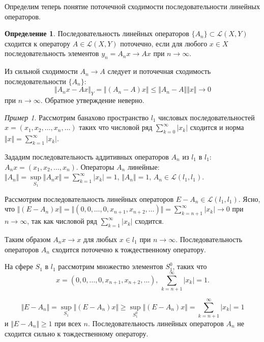 \documentclass[12pt,a4paper,titlepage,oneside]{book}
\theoremstyle{definition}
\newtheorem*{definition}{Определение}
\theoremstyle{plain}
\theoremstyle{break}
\theoremstyle{remark}
\theoremstyle{remark}
\newtheorem*{example}{Пример}
\theoremstyle{remark}
\theoremstyle{remark}
\theoremstyle{plain}
\theoremstyle{plain}
\begin{document}
Определим теперь понятие поточечной сходимости последовательности линейных операторов.

\begin{definition}
Последовательность линейных операторов $\{A_n\} \subset \mathcal{L}(X,Y)$ сходится к оператору $A\in \mathcal{L}(X,Y)$ поточечно, если для любого $x\in X$ последовательность элементов $y_n=A_nx\to Ax$ при $n\to \infty$.
\end{definition}

Из сильной сходимости $A_n\to A$ следует и поточечная сходимость последовательности $\{A_n\}$:
$$\Vert A_nx-Ax\Vert_Y = \Vert(A_n-A)x\Vert\le \Vert A_n-A\Vert \Vert x\Vert\to 0$$ 
при $n\to \infty$.
Обратное утверждение неверно.

\begin{example}
Рассмотрим банахово пространство $l_1$ числовых последовательностей $x=(x_1,x_2,\ldots,x_n,\ldots)$ таких что числовой ряд $\displaystyle\sum_{k=0}^\infty \lvert x_k\rvert $ сходится и норма $\Vert x\Vert=\displaystyle\sum_{k=1}^\infty \lvert x_k\rvert$.

Зададим последовательность аддитивных операторов $A_n$ из $l_1$ в $l_1$: 
$A_nx=(x_1,x_2,\ldots,x_n)$.
Операторы $A_n$ линейные:
$\Vert A_n\Vert=\sup \limits_{S_1} \Vert A_nx\Vert=\displaystyle\sum_{k=1}^\infty \lvert x_k\rvert =1$, $\Vert A_n\Vert=1$, $A_n\in \mathcal{L}(l_1,l_1)$.

Рассмотрим последовательность линейных операторов $E-A_n\in \mathcal{L}(l_1,l_1)$. Ясно, что $\Vert(E-A_n)x\Vert=\Vert(0,0,\ldots,0,x_{n+1},x_{n+2},\ldots)\Vert=\displaystyle\sum_{k=n+1}^\infty \lvert x_k\rvert  \to 0$ при $n\to \infty$, так как числовой ряд $\displaystyle\sum_{k=1}^\infty \lvert x_k\rvert $ сходится.

Таким образом $A_nx\to x$ для любых $x\in l_1$ при $n\to \infty$. Последовательность операторов $A_n$ сходится поточечно к тождественному оператору.

На сфере $S_1$ в $l_1$ рассмотрим множество элементов $S_1^0$, таких что 
$$x=(0,0,\ldots,0,x_{n+1},x_{n+2},\ldots) \mbox{, } \displaystyle\sum_{k=n+1}^\infty \lvert x_k\rvert=1.$$

$$\Vert E-A_n\Vert=\sup \limits_{S_1} \Vert(E-A_n)x\Vert \geqslant \sup \limits_{S_1^0} \Vert(E-A_n)x\Vert=\displaystyle\sum_{k=n+1}^\infty \lvert x_k\rvert=1$$
и $\Vert E-A_n\Vert \geqslant 1$ при всех $n$. Последовательность линейных операторов $A_n$ не сходится сильно к тождественному оператору.

\end{example}
\end{document}
